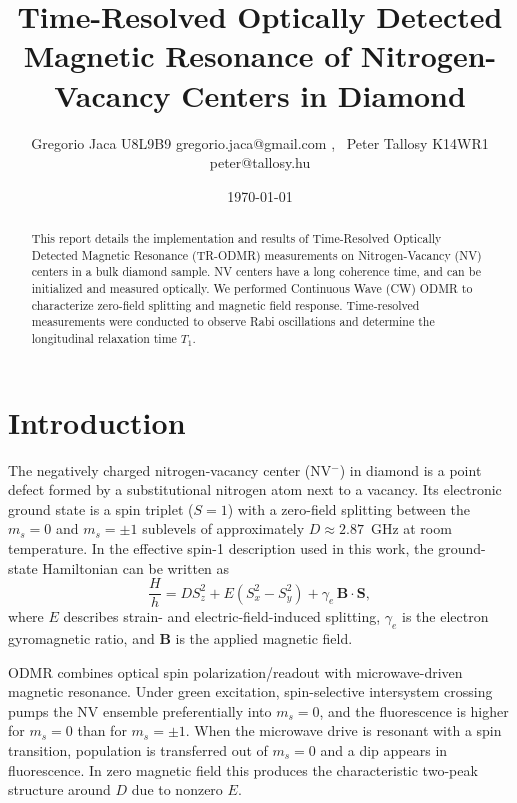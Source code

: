\documentclass[aps,prb,reprint,amsmath,amssymb,floatfix]{revtex4-2}
\begin{document}
\title{Time-Resolved Optically Detected Magnetic Resonance of Nitrogen-Vacancy Centers in Diamond}

\author{Gregorio Jaca U8L9B9 gregorio.jaca@gmail.com , \ Peter Tallosy K14WR1 peter@tallosy.hu }
\date{\today}

\begin{abstract}
This report details the implementation and results of Time-Resolved Optically Detected Magnetic Resonance (TR-ODMR) measurements on Nitrogen-Vacancy (NV) centers in a bulk diamond sample. NV centers have a long coherence time, and can be initialized and measured optically. We performed Continuous Wave (CW) ODMR to characterize zero-field splitting and magnetic field response. Time-resolved measurements were conducted to observe Rabi oscillations and determine the longitudinal relaxation time $T_1$. 
\end{abstract}

\maketitle

\section{Introduction}

The negatively charged nitrogen-vacancy center (NV$^-$) in diamond is a point defect formed by a substitutional nitrogen atom next to a vacancy. Its electronic ground state is a spin triplet ($S=1$) with a zero-field splitting between the $m_s=0$ and $m_s=\pm 1$ sublevels of approximately $D\approx2.87$~GHz at room temperature. In the effective spin-1 description used in this work, the ground-state Hamiltonian can be written as
\begin{equation}
\frac{H}{h}=D S_z^2 + E\left(S_x^2-S_y^2\right)+\gamma_e\,\mathbf{B}\cdot\mathbf{S},
\end{equation} 
\cite{loenard2025limitsabsolutevectormagnetometry} 
where $E$ describes strain- and electric-field-induced splitting, \(\gamma_e\) is the electron gyromagnetic ratio, and \(\mathbf{B}\) is the applied magnetic field.

ODMR combines optical spin polarization/readout with microwave-driven magnetic resonance. Under green excitation, spin-selective intersystem crossing pumps the NV ensemble preferentially into $m_s=0$, and the fluorescence is higher for $m_s=0$ than for $m_s=\pm1$. When the microwave drive is resonant with a spin transition, population is transferred out of $m_s=0$ and a dip appears in fluorescence. In zero magnetic field this produces the characteristic two-peak structure around $D$ due to nonzero $E$.
\end{document}
